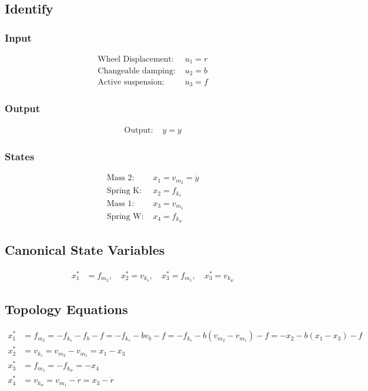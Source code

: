 \documentclass{article}
\begin{document}
\subsection{Identify}
\subsubsection{Input}
\begin{align*}
\text{Wheel Displacement: } & u_1 = r \\
\text{Changeable damping: } & u_2 = b \\
\text{Active suspension: } & u_3 = f
\end{align*}

\subsubsection{Output}
\begin{align*}
\text{Output: } & y = y
\end{align*}

\subsubsection{States}
\begin{align*}
\text{Mass 2: } & x_1 = v_{m_2} = \dot{y} \\
\text{Spring K: } & x_2 = f_{k_s} \\
\text{Mass 1: } & x_3 = v_{m_1} \\
\text{Spring W: } & x_4 = f_{k_w}
\end{align*}

\subsection{Canonical State Variables}
\begin{align*}
x^*_1 &= f_{m_2}, \quad x^*_2 = v_{k_s}, \quad x^*_3 = f_{m_1}, \quad x^*_3 = v_{k_w}
\end{align*}

\subsection{Topology Equations}
\begin{align*}
x^*_1 &= f_{m_2} = -f_{k_s} - f_b - f = -f_{k_s} - bv_b - f = -f_{k_s} - b(v_{m_2} - v_{m_1}) - f = -x_2 - b(x_1 - x_3)  - f \\
x^*_2 &= v_{k_s} = v_{m_2} - v_{m_1} = x_1 - x_3 \\
x^*_3 &= f_{m_1} = -f_{k_w} = -x_4 \\
x^*_4 &= v_{k_w} = v_{m_1} - \dot{r} = x_3 - \dot{r}
\end{align*}
\end{document}
